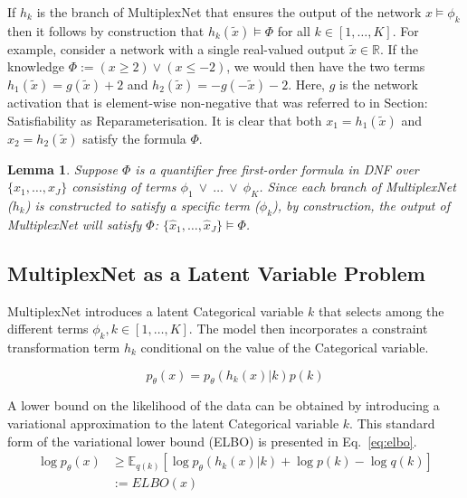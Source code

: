 \documentclass[letterpaper]{article} %
\newcommand{\E}{\mathbb{E}}
\newtheorem{lemma}[theorem]{Lemma}
\begin{document}
If $h_k$ is the branch of MultiplexNet that ensures the output of the network $x \models \phi_k$ then it follows by construction that $h_k(\tilde{x})\models \Phi$ for all $k \in [1, \dots, K]$.
For example, consider a network with a single real-valued output $\tilde{x} \in \mathbb{R}$. 
If the knowledge $\Phi := (x \geq 2) \lor (x \leq -2)$, we would then have the two terms $h_1(\tilde{x}) = g(\tilde{x}) + 2$ and $h_2(\tilde{x}) = -g(-\tilde{x}) - 2$. 
Here, $g$ is the network activation that is element-wise non-negative that was referred to in Section: Satisfiability as Reparameterisation.
It is clear that both $x_1 = h_1(\tilde{x})$ and $x_2 = h_2(\tilde{x})$ satisfy the formula $\Phi$.

\begin{lemma}
Suppose $\Phi$ is a quantifier free first-order formula in DNF over $\{x_1,\dots,x_J\}$ consisting of terms $\phi_1~\lor~\dots~\lor~\phi_K$.
Since each branch of MultiplexNet ($h_k$) is constructed to satisfy a specific term ($\phi_k$), by construction, the output of MultiplexNet will satisfy $\Phi$: $\{\hat{x}_1,\dots,\hat{x}_J\} \models \Phi$.
\end{lemma}

\subsection{MultiplexNet as a Latent Variable Problem}

MultiplexNet introduces a latent Categorical variable $k$ that selects among the different terms $\phi_k, k \in [1, \dots, K]$.
The model then incorporates a constraint transformation term $h_k$ conditional on the value of the Categorical variable. 

\begin{equation}
    \label{eq:introduce_latent_categorical_variable}
    p_\theta(x) = p_\theta(h_k(x) | k)p(k)
\end{equation}

A lower bound on the likelihood of the data can be obtained by introducing a variational approximation to the latent Categorical variable $k$.
This standard form of the variational lower bound (ELBO) is presented in Eq.~\ref{eq:elbo}.
\begin{equation}
    \begin{split}
        \label{eq:elbo}
        \log p_\theta (x) &\geq  \E_{q(k)}[\log p_\theta(h_k(x) | k) + \log p(k) - \log q(k)] \\
        &:= ELBO(x)
    \end{split}
\end{equation}
\end{document}
